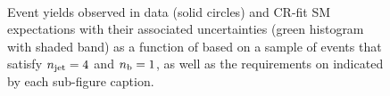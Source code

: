 \begin{figure}[h!]
\begin{center}
    \\
    \caption{Event yields observed in data (solid circles) and CR-fit SM expectations with their associated uncertainties (green histogram with shaded band) as a function of \HTmiss based on a sample of events that satisfy $n_{\text{jet}} = 4$ and $n_{\text{b}} = 1$, as well as the requirements on \scalht indicated by each sub-figure caption. }
    \label{fig:mhtval_eq4j_eq1b}
  \end{center}
\end{figure}

